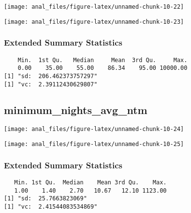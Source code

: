 \begin{center}\texttt{[image: anal\_files/figure-latex/unnamed-chunk-10-22]} \end{center}

\begin{center}\texttt{[image: anal\_files/figure-latex/unnamed-chunk-10-23]} \end{center}

\hypertarget{extended-summary-statistics-4}{%
\subsubsection{Extended Summary
Statistics}\label{extended-summary-statistics-4}}

\begin{verbatim}    Min.  1st Qu.   Median     Mean  3rd Qu.     Max. 
    0.00    35.00    55.00    86.34    95.00 10000.00 
[1] "sd:  206.462373757297"
[1] "vc:  2.39112430629807"
\end{verbatim}

\pagebreak

\centering

\hypertarget{minimum_nights_avg_ntm}{%
\subsection{minimum\_nights\_avg\_ntm}\label{minimum_nights_avg_ntm}}

\begin{center}\texttt{[image: anal\_files/figure-latex/unnamed-chunk-10-24]} \end{center}

\begin{center}\texttt{[image: anal\_files/figure-latex/unnamed-chunk-10-25]} \end{center}

\hypertarget{extended-summary-statistics-5}{%
\subsubsection{Extended Summary
Statistics}\label{extended-summary-statistics-5}}

\begin{verbatim}   Min. 1st Qu.  Median    Mean 3rd Qu.    Max. 
   1.00    1.40    2.70   10.67   12.10 1123.00 
[1] "sd:  25.7663823069"
[1] "vc:  2.41544083534869"
\end{verbatim}

